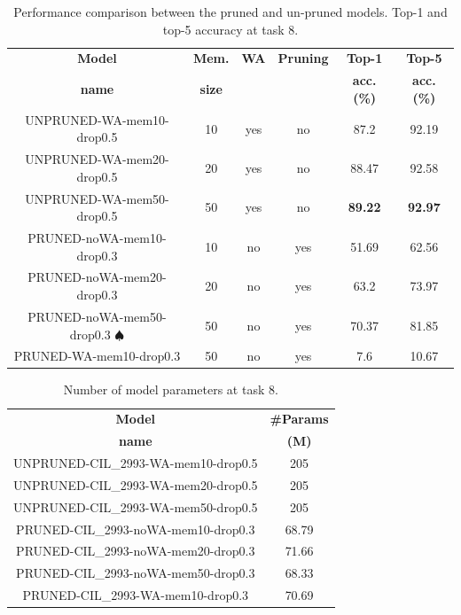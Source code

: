 \begin{table}[H]
    \centering
    \begin{tabular}{c|c|c|c|c|c}
        \hline
        \textbf{Model} &
        \textbf{Mem.} &
        \textbf{WA} &
        \textbf{Pruning} &
        \textbf{Top-1} & 
        \textbf{Top-5} \\
        \textbf{name} &
        \textbf{size} &
        &
        &
        \textbf{acc. (\%)} & 
        \textbf{acc. (\%)} \\
        \hline
        \hline
UNPRUNED-WA-mem10-drop0.5&10&yes&no&87.2&92.19\\
UNPRUNED-WA-mem20-drop0.5&20&yes&no&88.47&92.58\\
UNPRUNED-WA-mem50-drop0.5&50&yes&no&\textbf{89.22}&\textbf{92.97}\\
\hline
PRUNED-noWA-mem10-drop0.3&10&no&yes&51.69&62.56\\
PRUNED-noWA-mem20-drop0.3&20&no&yes&63.2&73.97\\
PRUNED-noWA-mem50-drop0.3 $\spadesuit$&50&no&yes&70.37&81.85\\
\hline
PRUNED-WA-mem10-drop0.3&50&no&yes&7.6&10.67\\
\hline
\end{tabular}
\caption{Performance comparison between the pruned and un-pruned models. Top-1 and top-5 accuracy at task 8.}
    \label{table:exp7}
\end{table}


\begin{table}[H]
    \centering
    \begin{tabular}{c|c}
        \hline
        \textbf{Model} &
        \textbf{\#Params} \\
        \textbf{name} &
        \textbf{(M)} \\
        \hline
        \hline
UNPRUNED-CIL\_2993-WA-mem10-drop0.5&205\\
UNPRUNED-CIL\_2993-WA-mem20-drop0.5&205\\
UNPRUNED-CIL\_2993-WA-mem50-drop0.5&205\\
\hline
PRUNED-CIL\_2993-noWA-mem10-drop0.3&68.79\\
PRUNED-CIL\_2993-noWA-mem20-drop0.3&71.66\\
PRUNED-CIL\_2993-noWA-mem50-drop0.3&68.33\\
\hline
PRUNED-CIL\_2993-WA-mem10-drop0.3&70.69\\
        \hline
    \end{tabular}
	\caption{Number of model parameters at task 8.}%
    \label{table:exp7-params}
\end{table}

